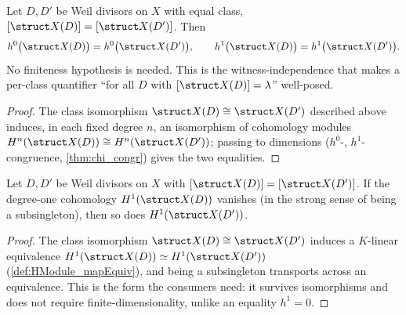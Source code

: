 \begin{theorem}
  \label{thm:h0h1_divisorSheaf_class}
  \leanok
  Let \(D, D'\) be Weil divisors on \(X\) with equal class, \([\struct X(D)] = [\struct
  X(D')]\). Then
  \[
    h^0\bigl(\struct X(D)\bigr) = h^0\bigl(\struct X(D')\bigr), \qquad
    h^1\bigl(\struct X(D)\bigr) = h^1\bigl(\struct X(D')\bigr).
  \]
  No finiteness hypothesis is needed. This is the witness-independence that makes a per-class
  quantifier ``for all \(D\) with \([\struct X(D)] = \lambda\)'' well-posed.
\end{theorem}
\begin{proof}
  \leanok
  The class isomorphism \(\struct X(D) \cong \struct X(D')\) described above induces, in each
  fixed degree \(n\), an isomorphism of cohomology modules \(H^n(\struct X(D)) \cong
  H^n(\struct X(D'))\); passing to dimensions (\(h^0\)-, \(h^1\)-congruence,
  \ref{thm:chi_congr}) gives the two equalities.
\end{proof}

\begin{theorem}
  \label{thm:subsingleton_hModule_one_class}
  \leanok
  Let \(D, D'\) be Weil divisors on \(X\) with \([\struct X(D)] = [\struct X(D')]\). If the
  degree-one cohomology \(H^1(\struct X(D))\) vanishes (in the strong sense of being a
  subsingleton), then so does \(H^1(\struct X(D'))\).
\end{theorem}
\begin{proof}
  \leanok
  The class isomorphism \(\struct X(D) \cong \struct X(D')\) induces a \(K\)-linear equivalence
  \(H^1(\struct X(D)) \simeq H^1(\struct X(D'))\) (\ref{def:HModule_mapEquiv}), and being a
  subsingleton transports across an equivalence. This is the form the consumers need: it
  survives isomorphisms and does not require finite-dimensionality, unlike an equality
  \(h^1 = 0\).
\end{proof}

